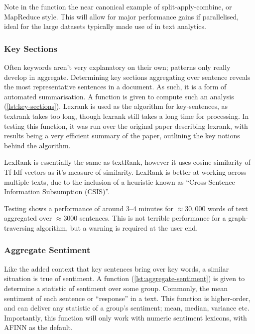 \documentclass[11pt, a4paper, twoside, titlepage]{report}
\begin{document}
Note in the function the near canonical example of
split-apply-combine, or MapReduce style. This will allow for major
performance gains if parallelised, ideal for the large datasets
typically made use of in text analytics.

\subsubsection{Key Sections}\label{sec:key-section}

Often keywords aren't very explanatory on their own; patterns only
really develop in aggregate. Determining key sections aggregating over
sentence reveals the most representative sentences in a document. As
such, it is a form of automated summarisation. A function is given to
compute such an analysis (\cref{lst:key-sections}). Lexrank is used as
the algorithm for key-sentences, as textrank takes too long, though
lexrank still takes a long time for processing\autocite{spannbauer19}.
In testing this function, it was run over the original paper
describing lexrank, with results being a very efficient summary of the
paper, outlining the key notions behind the algorithm.

LexRank is essentially the same as textRank, however it uses cosine
similarity of Tf-Idf vectors as it's measure of similarity. LexRank is
better at working across multiple texts, due to the inclusion of a
heuristic known as ``Cross-Sentence Information Subsumption (CSIS)''.

Testing shows a performance of around 3--4 minutes for \(\approx 30,000\)
words of text aggregated over \(\approx 3000\) sentences. This is not
terrible performance for a graph-traversing algorithm, but a warning
is required at the user end.

\subsubsection{Aggregate Sentiment}\label{sec:aggregate-sentiment}

Like the added context that key sentences bring over key words, a
similar situation is true of sentiment. A function
(\cref{lst:aggregate-sentiment}) is given to determine a
statistic of sentiment over some group. Commonly, the mean sentiment
of each sentence or ``response'' in a text. This function is
higher-order, and can deliver any statistic of a group's sentiment;
mean, median, variance etc. Importantly, this function will only work
with numeric sentiment lexicons, with AFINN as the default.
\end{document}

